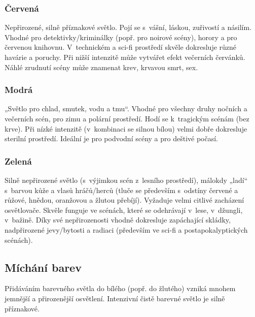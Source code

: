 \subsubsection{ 	Červená} Nepřirozené, silně příznakové světlo. Pojí se s~vášní, láskou, zuřivostí a násilím. 
Vhodné pro detektivky/kriminálky (popř. pro noirové scény), horory a pro červenou knihovnu. V~technickém a sci-fi prostředí skvěle dokresluje různé havárie a poruchy. Při nižší intenzitě může vytvářet efekt večerních červánků. 
Náhlé zrudnutí scény může znamenat krev, krvavou smrt, sex. 
\subsubsection{ 	Modrá } „Světlo pro chlad, smutek, vodu a tmu“.  
Vhodné pro všechny druhy nočních a večerních scén, pro zimu a polární prostředí. Hodí se k~tragickým scénám (bez krve). Při nízké intenzitě (v~kombinaci se silnou bílou) velmi dobře dokresluje sterilní prostředí. Ideální je pro podvodní scény a pro deštivé počasí.  
\subsubsection{ 	Zelená } Silně nepřirozené světlo (s~výjimkou scén z~lesního prostředí), málokdy „ladí“ s~barvou kůže a vlasů hráčů/herců (tluče se především s~odstíny červené a růžové, hnědou, oranžovou a žlutou přebíjí). Vyžaduje velmi citlivé zacházení osvětlovače. 
Skvěle funguje ve scénách, které se odehrávají v~lese, v~džungli, v~bažině. 
Díky své nepřirozenosti vhodně dokresluje zapáchající skládky, nadpřirozené jevy/bytosti a radiaci (především ve sci-fi a postapokalyptických scénách). 
 
 
\subsection{	Míchání barev } Přidáváním barevného světla do bílého (popř. do žlutého) vzniká mnohem jemnější a přirozenější osvětlení. Intenzivní čistě barevné světlo je silně příznakové.  
